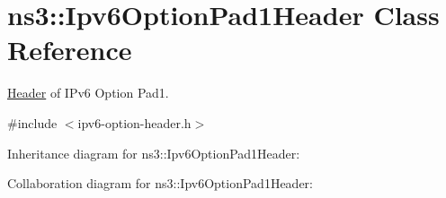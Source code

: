 \hypertarget{classns3_1_1Ipv6OptionPad1Header}{}\section{ns3\+:\+:Ipv6\+Option\+Pad1\+Header Class Reference}
\label{classns3_1_1Ipv6OptionPad1Header}


\hyperlink{classns3_1_1Header}{Header} of I\+Pv6 Option Pad1.  




{\ttfamily \#include $<$ipv6-\/option-\/header.\+h$>$}



Inheritance diagram for ns3\+:\+:Ipv6\+Option\+Pad1\+Header\+:


Collaboration diagram for ns3\+:\+:Ipv6\+Option\+Pad1\+Header\+:
